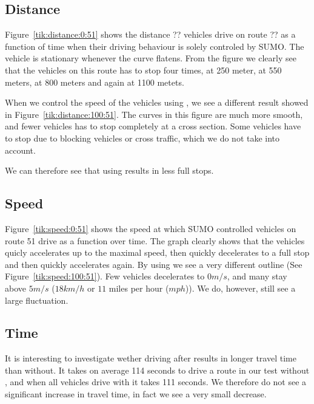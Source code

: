 \subsection{Distance}
Figure~\ref{tik:distance:0:51} shows the distance ?? vehicles drive on route ?? as a function of time when their driving behaviour is solely controled by SUMO. 
The vehicle is stationary whenever the curve flatens.
From the figure we clearly see that the vehicles on this route has to stop four times, at 250 meter, at 550 meters, at 800 meters and again at 1100 metets.

When we control the speed of the vehicles using \tech, we see a different result showed in Figure~\ref{tik:distance:100:51}.
The curves in this figure are much more smooth, and fewer vehicles has to stop completely at a cross section.
Some vehicles have to stop due to blocking vehicles or cross traffic, which we do not take into account.

We can therefore see that using \tech results in less full stops.
%
%

\subsection{Speed}
Figure~\ref{tik:speed:0:51} shows the speed at which SUMO controlled vehicles on route 51 drive as a function over time.
The graph clearly shows that the vehicles quicly accelerates up to the maximal speed, then quickly decelerates to a full stop and then quickly accelerates again.
By using \tech we see a very different outline (See Figure~\ref{tik:speed:100:51}).
Few vehicles decelerates to $0 m/s$, and many stay above $5 m/s$ ($18 km/h$ or $11$ miles per hour ($mph$)).
We do, however, still see a large fluctuation.
%
%

\subsection{Time}
It is interesting to investigate wether driving after \tech results in longer travel time than without.
It takes on average 114 seconds to drive a route in our test without \tech, and when all vehicles drive with \tech it takes 111 seconds. 
We therefore do not see a significant increase in travel time, in fact we see a very small decrease.


